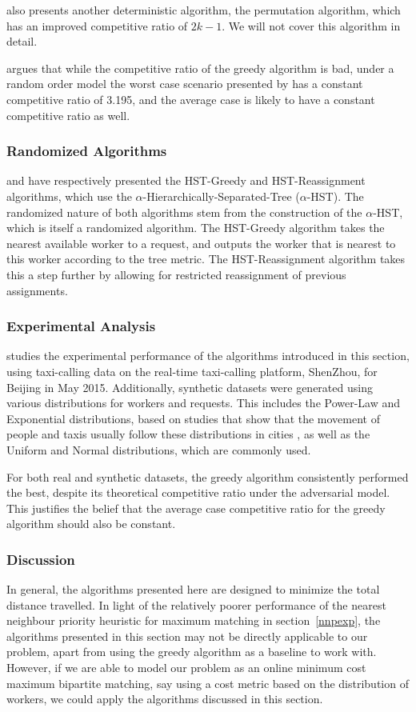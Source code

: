 \documentclass[urop]{nurop}
\begin{document}
\cite{greedy} also presents another deterministic algorithm, the permutation algorithm, which has an improved competitive ratio of $2k -1$. We will not cover this algorithm in detail.

\cite{tong} argues that while the competitive ratio of the greedy algorithm is bad, under a random order model the worst case scenario presented by \cite{greedy} has a constant competitive ratio of 3.195, and the average case is likely to have a constant competitive ratio as well.

\subsubsection{Randomized Algorithms}
\cite{hst-g} and \cite{hst-re} have respectively presented the HST-Greedy and HST-Reassignment algorithms, which use the $\alpha$-Hierarchically-Separated-Tree ($\alpha$-HST). The randomized nature of both algorithms stem from the construction of the $\alpha$-HST, which is itself a randomized algorithm. The HST-Greedy algorithm takes the nearest available worker to a request, and outputs the worker that is nearest to this worker according to the tree metric. The HST-Reassignment algorithm takes this a step further by allowing for restricted reassignment of previous assignments.

\subsubsection{Experimental Analysis}
\cite{tong} studies the experimental performance of the algorithms introduced in this section, using taxi-calling data on the real-time taxi-calling platform, ShenZhou, for Beijing in May 2015. Additionally, synthetic datasets were generated using various distributions for workers and requests. This includes the Power-Law and Exponential distributions, based on studies that show that the movement of people and taxis usually follow these distributions in cities \cite{dist1,dist2}, as well as the Uniform and Normal distributions, which are commonly used.

For both real and synthetic datasets, the greedy algorithm consistently performed the best, despite its theoretical competitive ratio under the adversarial model. This justifies the belief that the average case competitive ratio for the greedy algorithm should also be constant.

\subsubsection{Discussion}
In general, the algorithms presented here are designed to minimize the total distance travelled. In light of the relatively poorer performance of the nearest neighbour priority heuristic for maximum matching in section~\ref{nnpexp}, the algorithms presented in this section may not be directly applicable to our problem, apart from using the greedy algorithm as a baseline to work with. However, if we are able to model our problem as an online minimum cost maximum bipartite matching, say using a cost metric based on the distribution of workers, we could apply the algorithms discussed in this section.
\end{document}
